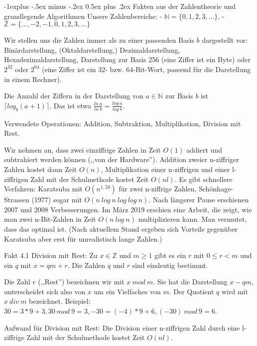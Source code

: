 \documentclass[a4paper]{article}
\makeatletter
\renewcommand{\subsection}{\@startsection{subsection}{2}{0mm}%
 {-1explus -.5ex minus -.2ex}%
 {0.5ex plus .2ex}%
 {\normalfont\normalsize\bfseries}}
\makeatother
\begin{document}
\begin{multicols}{3}
    \subsection{Fakten aus der Zahlentheorie und grundlegende Algorithmen}
    Unsere Zahlenbereiche:
    - $\mathbb{N}=\{ 0 , 1 , 2 , 3 ,...\}$,
    - $\mathbb{Z}=\{...,- 2 ,- 1 , 0 , 1 , 2 , 3 ,...\}$

    Wir stellen uns die Zahlen immer als zu einer passenden Basis $b$ dargestellt vor: Binärdarstellung, (Oktaldarstellung,) Dezimaldarstellung, Hexadezimaldarstellung, Darstellung zur Basis 256 (eine Ziffer ist ein Byte) oder $2^{32}$ oder $2^{64}$ (eine Ziffer ist ein 32- bzw. 64-Bit-Wort, passend für die Darstellung in einem Rechner).

    Die Anzahl der Ziffern in der Darstellung von $a\in\mathbb{N}$ zur Basis $b$ ist $\lceil  log_b(a+1)\rceil$. Das ist etwa $\frac{ln\ a}{ln\ b}=\frac{log\ a}{log\ b}$.

    Verwendete Operationen: Addition, Subtraktion, Multiplikation, Division mit Rest.

    Wir nehmen an, dass zwei einziffrige Zahlen in Zeit $O(1)$ addiert und subtrahiert werden können (,,von der Hardware''). Addition zweier n-ziffriger Zahlen kostet dann Zeit $O(n)$, Multiplikation einer n-ziffrigen und einer l-ziffrigen Zahl mit der Schulmethode kostet Zeit $O(nl)$. Es gibt schnellere Verfahren: Karatsuba mit $O(n^{1,59})$ für zwei n-ziffrige Zahlen, Schönhage-Strassen (1977) sogar mit $O(n\ log\ n\ log\ log\ n)$. Nach längerer Pause erschienen 2007 und 2008 Verbesserungen. Im März 2019 erschien eine Arbeit, die zeigt, wie man zwei n-Bit-Zahlen in Zeit $O(n\ log\ n)$ multiplizieren kann. Man vermutet, dass das optimal ist. (Nach aktuellem Stand ergeben sich Vorteile gegenüber Karatsuba aber erst für unrealistisch lange Zahlen.)

    Fakt 4.1 Division mit Rest: Zu $x\in\mathbb{Z}$ und $m\geq 1$ gibt es ein $r$ mit $0\leq r < m$ und ein $q$ mit $x=qm+r$. Die Zahlen $q$ und $r$ sind eindeutig bestimmt.

    Die Zahl $r$ (,,Rest'') bezeichnen wir mit $x\ mod\ m$. Sie hat die Darstellung $x-qm$, unterscheidet sich also von $x$ um ein Vielfaches von $m$. Der Quotient $q$ wird mit $x\ div\ m$ bezeichnet.
    Beispiel: $30 = 3*9 + 3, 30\ mod\ 9 = 3, -30 = (-4) *9 + 6, (-30)\ mod\ 9 = 6$.

    Aufwand für Division mit Rest: Die Division einer n-ziffrigen Zahl durch eine l-ziffrige Zahl mit der Schulmethode kostet Zeit $O(nl)$.


\end{multicols}
\end{document}
